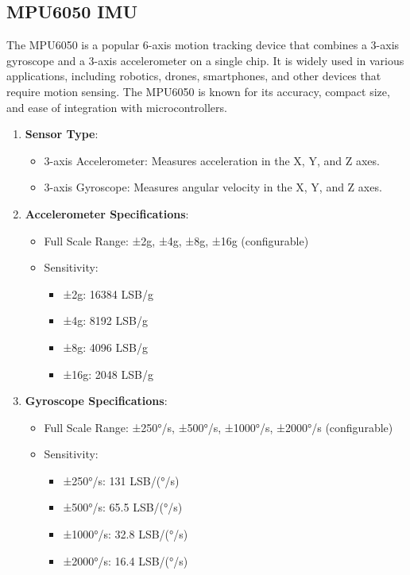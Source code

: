 \subsection{\fontsize{14}{16} MPU6050 IMU}
{
	\fontsize{12}{14}
	The MPU6050 is a popular 6-axis motion tracking device that combines a 3-axis gyroscope and a 3-axis accelerometer on a single chip. It is widely used in various applications, including robotics, drones, smartphones, and other devices that require motion sensing. The MPU6050 is known for its accuracy, compact size, and ease of integration with microcontrollers.
	\begin{enumerate}
		\item \textbf{Sensor Type}:
		\begin{itemize}
			\item 3-axis Accelerometer: Measures acceleration in the X, Y, and Z axes.
			\item 3-axis Gyroscope: Measures angular velocity in the X, Y, and Z axes.
		\end{itemize}
		
		\item \textbf{Accelerometer Specifications}:
		\begin{itemize}
			\item Full Scale Range: ±2g, ±4g, ±8g, ±16g (configurable)
			\item Sensitivity:
				\begin{itemize}
					\item ±2g: 16384 LSB/g
					\item ±4g: 8192 LSB/g
					\item ±8g: 4096 LSB/g
					\item ±16g: 2048 LSB/g
				\end{itemize}
		\end{itemize}
		
		\item \textbf{Gyroscope Specifications}:
		\begin{itemize}
			\item Full Scale Range: ±250°/s, ±500°/s, ±1000°/s, ±2000°/s (configurable)
			\item Sensitivity:
			\begin{itemize}
				\item ±250°/s: 131 LSB/(°/s)
				\item ±500°/s: 65.5 LSB/(°/s)
				\item ±1000°/s: 32.8 LSB/(°/s)
				\item ±2000°/s: 16.4 LSB/(°/s)
			\end{itemize}
		\end{itemize}
		

\end{enumerate}}

